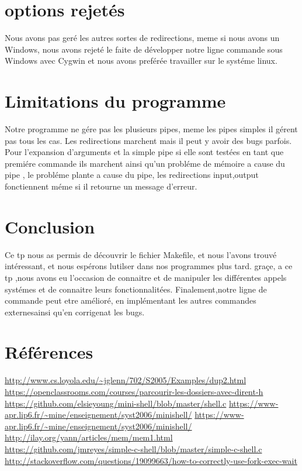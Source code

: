 \documentclass{article}
\begin{document}
\section{options rejetés}
Nous avons pas geré les autres sortes de redirections, meme si nous avons un Windows, nous avons rejeté le faite de développer notre ligne commande sous Windows avec Cygwin et nous avons preférée travailler sur le systéme linux.
\section{Limitations du programme}
Notre programme ne gére pas les  plusieurs pipes, meme les pipes simples il gérent pas tous les cas.
Les redirections marchent mais il peut y avoir des bugs parfois.
Pour l'expansion d'arguments et la simple pipe si elle sont testées en tant que premiére commande ils marchent ainsi qu'un probléme de mémoire a cause du pipe , le probléme plante a cause du pipe, les redirections input,output fonctiennent méme si il retourne un message d'erreur.
\section{Conclusion}
Ce tp nous as permis de découvrir le fichier Makefile, et nous l'avons trouvé intéressant, et nous espérons lutilser dans nos programmes plus tard.
gra\c{c}e, a ce tp ,nous avons eu l'occasion de connaitre et de manipuler  les différentes appels systémes et de connaitre leurs fonctionnalitées. 
\newline Finalement,notre ligne de commande peut  etre amélioré, en implémentant les autres commandes externesainsi qu'en corrigenat les bugs. 
\section{Références}
 \url{http://www.cs.loyola.edu/~jglenn/702/S2005/Examples/dup2.html}
 \newline\url{https://openclassrooms.com/courses/parcourir-les-dossiers-avec-dirent-h}
 \newline \url{https://github.com/elsieyoung/mini-shell/blob/master/shell.c}
 \newline \url{https://www-apr.lip6.fr/~mine/enseignement/syst2006/minishell/}
 \newline \url{https://www-apr.lip6.fr/~mine/enseignement/syst2006/minishell/}
 \newline\url{http://ilay.org/yann/articles/mem/mem1.html}
 \newline\url{https://github.com/jmreyes/simple-c-shell/blob/master/simple-c-shell.c}
 \newline\url{http://stackoverflow.com/questions/19099663/how-to-correctly-use-fork-exec-wait}
\end{document}
